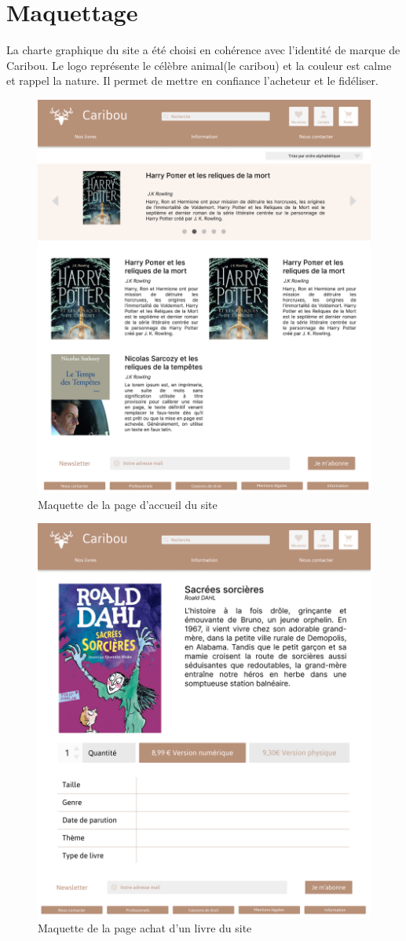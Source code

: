 \documentclass[14pt]{extarticle}
\begin{document}
\newpage
\section{Maquettage}
La charte graphique du site a été choisi en cohérence avec l'identité de marque de Caribou. Le logo représente le célèbre animal(le caribou) et la couleur est calme et rappel la nature. Il permet de mettre en confiance l'acheteur et le fidéliser.
\begin{figure}[H]
    \centering
    \includegraphics[width=0.8\linewidth]{images/m_accueil.png}
    \caption{Maquette de la page d'accueil du site}
\end{figure}
\begin{figure}[H]
    \centering
    \includegraphics[width=0.8\linewidth]{images/m_livre.png}
    \caption{Maquette de la page achat d'un livre du site}
\end{figure}
\end{document}
